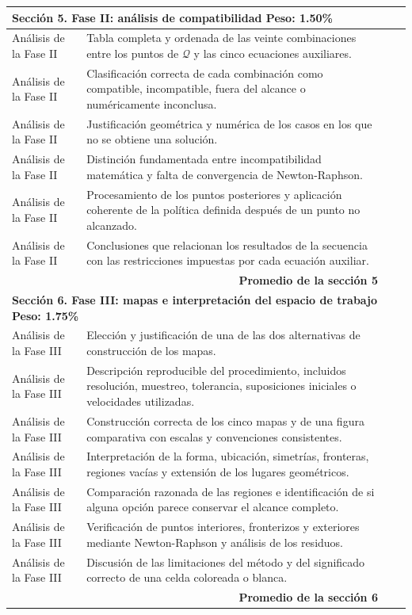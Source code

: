 \documentclass[12pt]{article}
\begin{document}
{\begin{longtable}{|p{3.7cm}|p{7.0cm}|>{\centering\arraybackslash}p{1cm}|p{3.0cm}|}
\multicolumn{4}{|l|}{\textbf{Sección 5. Fase II: análisis de compatibilidad \hfill Peso: 1.50\%}}\\
\hline
Análisis de la Fase II &
Tabla completa y ordenada de las veinte combinaciones entre los puntos de \(\mathcal Q\) y las cinco ecuaciones auxiliares. & & \\
\hline
Análisis de la Fase II &
Clasificación correcta de cada combinación como compatible, incompatible, fuera del alcance o numéricamente inconclusa. & & \\
\hline
Análisis de la Fase II &
Justificación geométrica y numérica de los casos en los que no se obtiene una solución. & & \\
\hline
Análisis de la Fase II &
Distinción fundamentada entre incompatibilidad matemática y falta de convergencia de Newton-Raphson. & & \\
\hline
Análisis de la Fase II &
Procesamiento de los puntos posteriores y aplicación coherente de la política definida después de un punto no alcanzado. & & \\
\hline
Análisis de la Fase II &
Conclusiones que relacionan los resultados de la secuencia con las restricciones impuestas por cada ecuación auxiliar. & & \\
\hline
\multicolumn{2}{|r|}{\textbf{Promedio de la sección 5}} & & \\
\hline

\multicolumn{4}{|l|}{\textbf{Sección 6. Fase III: mapas e interpretación del espacio de trabajo \hfill Peso: 1.75\%}}\\
\hline
Análisis de la Fase III &
Elección y justificación de una de las dos alternativas de construcción de los mapas. & & \\
\hline
Análisis de la Fase III &
Descripción reproducible del procedimiento, incluidos resolución, muestreo, tolerancia, suposiciones iniciales o velocidades utilizadas. & & \\
\hline
Análisis de la Fase III &
Construcción correcta de los cinco mapas y de una figura comparativa con escalas y convenciones consistentes. & & \\
\hline
Análisis de la Fase III &
Interpretación de la forma, ubicación, simetrías, fronteras, regiones vacías y extensión de los lugares geométricos. & & \\
\hline
Análisis de la Fase III &
Comparación razonada de las regiones e identificación de si alguna opción parece conservar el alcance completo. & & \\
\hline
Análisis de la Fase III &
Verificación de puntos interiores, fronterizos y exteriores mediante Newton-Raphson y análisis de los residuos. & & \\
\hline
Análisis de la Fase III &
Discusión de las limitaciones del método y del significado correcto de una celda coloreada o blanca. & & \\
\hline
\multicolumn{2}{|r|}{\textbf{Promedio de la sección 6}} & & \\
\hline


\end{longtable}}
\end{document}
